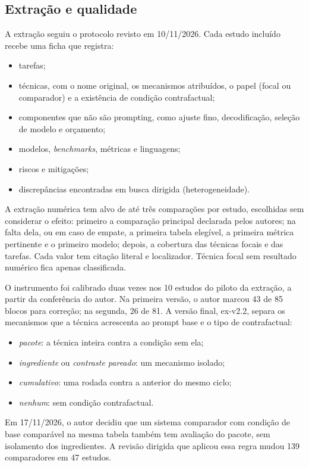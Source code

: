 \subsection{Extração e qualidade}\label{sec:extracao}
A extração seguiu o protocolo revisto em 10/11/2026. Cada estudo incluído recebe uma ficha que registra:
\begin{itemize}
  \item tarefas;
  \item técnicas, com o nome original, os mecanismos atribuídos, o papel (focal ou comparador) e a existência
  de condição contrafactual;
  \item componentes que não são prompting, como ajuste fino, decodificação, seleção de modelo e orçamento;
  \item modelos, \textit{benchmarks}, métricas e linguagens;
  \item riscos e mitigações;
  \item discrepâncias encontradas em busca dirigida (heterogeneidade).
\end{itemize}
A extração numérica tem alvo de até três comparações por estudo, escolhidas sem considerar o efeito: primeiro a
comparação principal declarada pelos autores; na falta dela, ou em caso de empate, a primeira tabela elegível, a
primeira métrica pertinente e o primeiro modelo; depois, a cobertura das técnicas focais e das tarefas. Cada valor
tem citação literal e localizador. Técnica focal sem resultado numérico fica apenas classificada.

O instrumento foi calibrado duas vezes nos 10 estudos do piloto da extração, a partir da conferência do autor. Na
primeira versão, o autor marcou 43 de 85 blocos para correção; na segunda, 26 de 81. A versão final, ex-v2.2,
separa os mecanismos que a técnica acrescenta ao prompt base e o tipo de contrafactual:
\begin{itemize}
  \item \textit{pacote}: a técnica inteira contra a condição sem ela;
  \item \textit{ingrediente} ou \textit{contraste pareado}: um mecanismo isolado;
  \item \textit{cumulativo}: uma rodada contra a anterior do mesmo ciclo;
  \item \textit{nenhum}: sem condição contrafactual.
\end{itemize}
Em 17/11/2026, o autor decidiu que um sistema comparador com condição de base comparável na mesma tabela também
tem avaliação do pacote, sem isolamento dos ingredientes. A revisão dirigida que aplicou essa regra mudou 139
comparadores em 47 estudos.

